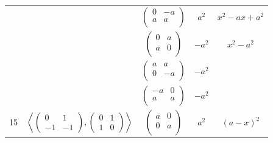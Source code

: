\documentclass[a4paper,12pt]{amsart}
\begin{document}
\begin{table}[h]
\begin{tabular}{|c|c|c|c|c|}
			
			& &  $\begin{pmatrix}
				0 & -a \\        
				a & a \\
			\end{pmatrix}$
			
			&   $a^2$   &   $x^2 - ax + a^2$                \\
			
			
			& &  $\begin{pmatrix}
				0 & a \\        
				a & 0 \\
			\end{pmatrix}$
			
			&   $-a^2$   &   $x^2 - a^2$                \\
			
			
			& & $\begin{pmatrix}
				a & a \\        
				0 & -a \\
			\end{pmatrix}$
			
			&  $-a^2$   &            \\
			
			
			& &  $\begin{pmatrix}
				-a & 0 \\        
				a & a \\
			\end{pmatrix}$
			
			&   $-a^2$     &                           \\
			
			\hline
			
			
			\multirow{6}{*}{15} 
			& \multirow{8}{*}{
				$\left\langle 
				\begin{pmatrix}
					0 & 1 \\ 
					-1 & -1 
				\end{pmatrix}, 
				\begin{pmatrix}
					0 & 1 \\ 
					1 & 0 
				\end{pmatrix}
				\right\rangle$	
			}
			& $\begin{pmatrix}
				a & 0 \\        
				0 & a \\
			\end{pmatrix}$
			
			&  $a^2$   &       $(a - x)^2$     \\
			

\end{tabular}
\end{table}
\end{document}
